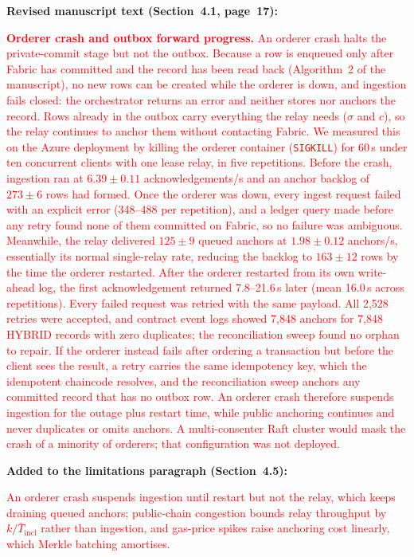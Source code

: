 \documentclass[11pt]{article}
\begin{document}
\medskip
\noindent\textbf{Revised manuscript text (Section~4.1, page~17):}

\textcolor{red}{\textbf{Orderer crash and outbox forward progress.} An orderer crash halts the private-commit stage but not the outbox. Because a row is enqueued only after Fabric has committed and the record has been read back (Algorithm~2 of the manuscript), no new rows can be created while the orderer is down, and ingestion fails closed: the orchestrator returns an error and neither stores nor anchors the record. Rows already in the outbox carry everything the relay needs ($\sigma$ and $c$), so the relay continues to anchor them without contacting Fabric. We measured this on the Azure deployment by killing the orderer container (\texttt{SIGKILL}) for 60\,s under ten concurrent clients with one lease relay, in five repetitions. Before the crash, ingestion ran at $6.39\pm0.11$ acknowledgements/s and an anchor backlog of $273\pm6$ rows had formed. Once the orderer was down, every ingest request failed with an explicit error (348--488 per repetition), and a ledger query made before any retry found none of them committed on Fabric, so no failure was ambiguous. Meanwhile, the relay delivered $125\pm9$ queued anchors at $1.98\pm0.12$ anchors/s, essentially its normal single-relay rate, reducing the backlog to $163\pm12$ rows by the time the orderer restarted. After the orderer restarted from its own write-ahead log, the first acknowledgement returned 7.8--21.6\,s later (mean 16.0\,s across repetitions). Every failed request was retried with the same payload. All 2{,}528 retries were accepted, and contract event logs showed 7{,}848 anchors for 7{,}848 HYBRID records with zero duplicates; the reconciliation sweep found no orphan to repair. If the orderer instead fails after ordering a transaction but before the client sees the result, a retry carries the same idempotency key, which the idempotent chaincode resolves, and the reconciliation sweep anchors any committed record that has no outbox row. An orderer crash therefore suspends ingestion for the outage plus restart time, while public anchoring continues and never duplicates or omits anchors. A multi-consenter Raft cluster would mask the crash of a minority of orderers; that configuration was not deployed.}

\medskip
\noindent\textbf{Added to the limitations paragraph (Section~4.5):}

\textcolor{red}{An orderer crash suspends ingestion until restart but not the relay, which keeps draining queued anchors; public-chain congestion bounds relay throughput by $k/\bar{T}_{\mathrm{incl}}$ rather than ingestion, and gas-price spikes raise anchoring cost linearly, which Merkle batching amortises.}
\end{document}
